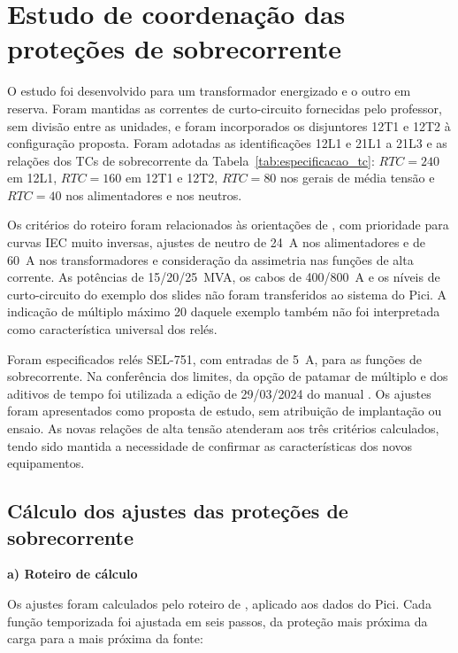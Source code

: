 \newpage
\section{\textbf{Estudo de coordenação das proteções de sobrecorrente}}

O estudo foi desenvolvido para um transformador energizado e o outro em reserva. Foram mantidas as correntes de curto-circuito fornecidas pelo professor, sem divisão entre as unidades, e foram incorporados os disjuntores 12T1 e 12T2 à configuração proposta. Foram adotadas as identificações 12L1 e 21L1 a 21L3 e as relações dos TCs de sobrecorrente da Tabela~\ref{tab:especificacao_tc}: $RTC=240$ em 12L1, $RTC=160$ em 12T1 e 12T2, $RTC=80$ nos gerais de média tensão e $RTC=40$ nos alimentadores e nos neutros.

Os critérios do roteiro \cite{sampaio2026roteiro} foram relacionados às orientações de \cite{cysne2026protecao}, com prioridade para curvas IEC muito inversas, ajustes de neutro de 24~A nos alimentadores e de 60~A nos transformadores e consideração da assimetria nas funções de alta corrente. As potências de 15/20/25~MVA, os cabos de 400/800~A e os níveis de curto-circuito do exemplo dos slides não foram transferidos ao sistema do Pici. A indicação de múltiplo máximo 20 daquele exemplo também não foi interpretada como característica universal dos relés.

Foram especificados relés SEL-751, com entradas de 5~A, para as funções de sobrecorrente. Na conferência dos limites, da opção de patamar de múltiplo e dos aditivos de tempo foi utilizada a edição de 29/03/2024 do manual \cite{sel2024sel751}. Os ajustes foram apresentados como proposta de estudo, sem atribuição de implantação ou ensaio. As novas relações de alta tensão atenderam aos três critérios calculados, tendo sido mantida a necessidade de confirmar as características dos novos equipamentos.

\subsection{Cálculo dos ajustes das proteções de sobrecorrente}

\textbf{a) Roteiro de cálculo}

Os ajustes foram calculados pelo roteiro de \cite{cysne2026protecao}, aplicado aos dados do Pici. Cada função temporizada foi ajustada em seis passos, da proteção mais próxima da carga para a mais próxima da fonte:

